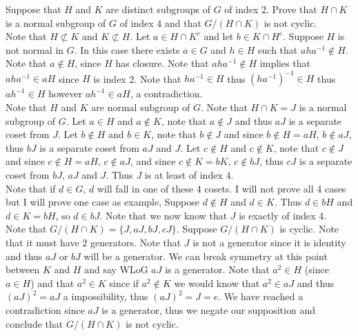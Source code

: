 \documentclass[12pt]{article}
\makeatletter
\theoremstyle{homework}
\newenvironment{exercise}[1]
{\def\@currentlabel{#1}\exercisecore}
{\endexercisecore}
\makeatother
\begin{document}
\begin{exercise}{10.59}
Suppose that $H$ and $K$ are distinct subgroups of $G$ of index $2$. Prove that $H \cap K$ is a normal subgroup of $G$ of index $4$ and that $G/(H \cap K)$ is not cyclic.\\
Note that $H\not\subset K$ and $K\not\subset H$.  Let $a\in H\cap K^c$ and let $b\in K\cap H^c$.  Suppose $H$ is not normal in $G$.  In this case there exists $a\in G$ and $h\in H$ such that $aha^{-1}\not\in H$.  Note that $a\not\in H$, since $H$ has closure.  Note that $aha^{-1}\not\in H$ implies that $aha^{-1}\in aH$ since $H$ is index 2.  Note that $ha^{-1}\in H$ thus $(ha^{-1})^{-1}\in H$ thus $ah^{-1}\in H$ however $ah^{-1}\in aH$, a contradiction.\\
Note that $H$ and $K$ are normal subgroup of $G$.  Note that $H\cap K=J$ is a normal subgroup of $G$.  Let $a\in H$ and $a\not\in K$, note that $a\not\in J$ and thus $aJ$ is a separate coset from $J$.  Let $b\not\in H$ and $b\in K$, note that $b\not\in J$ and since $b\not\in H=aH$, $b\not\in aJ$, thus $bJ$ is a separate coset from $aJ$ and $J$.  Let $c\not\in H$ and $c\not\in K$, note that $c\not\in J$ and since $c\not\in H=aH$, $c\not\in aJ$, and since $c\not\in K=bK$, $c\not\in bJ$, thus $cJ$ is a separate coset from $bJ$, $aJ$ and $J$.  Thus $J$ is at least of index 4.\\
Note that if $d\in G$, $d$ will fall in one of these 4 cosets.  I will not prove all 4 cases but I will prove one case as example, Suppose $d\not\in H$ and $d\in K$.  Thus $d\in bH$ and $d\in K=bH$, so $d\in bJ$.  Note that we now know that $J$ is exactly of index 4.\\
Note that $G/(H \cap K)=\{J,aJ,bJ,cJ\}$.  Suppose $G/(H \cap K)$ is cyclic.  Note that it must have $2$ generators.  Note that $J$ is not a generator since it is identity and thus $aJ$ or $bJ$ will be a generator.  We can break symmetry at this point between $K$ and $H$ and say WLoG $aJ$ is a generator.  Note that $a^2\in H$ (since $a\in H$) and that $a^2\in K$ since if $a^2\not\in K$ we would know that $a^2\in aJ$ and thus $(aJ)^2=aJ$ a impossibility, thus $(aJ)^2=J=e$.  We have reached a contradiction since $aJ$ is a generator, thus we negate our supposition and conclude that $G/(H \cap K)$ is not cyclic.
\end{exercise}
\end{document}
